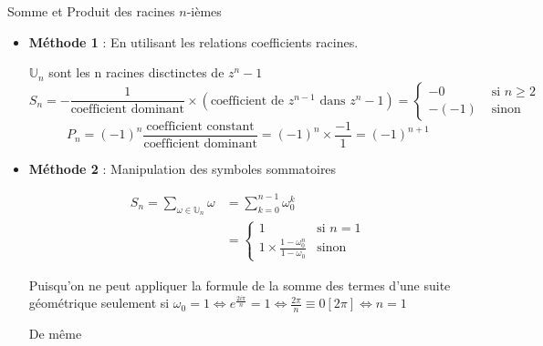 \documentclass{article}
\renewenvironment{question_kholle}[2][ ]
{
	\subsection{\texorpdfstring{#2}{}}
	\notblank{#1}
	{
		\noindent #1
		\bigbreak
	}
	{}
	\begin{proof}
}
{
	\end{proof}
}
\begin{document}
\begin{question_kholle}{Somme et Produit des racines $n$-ièmes}
  \;\\
  \begin{itemize}[label=$\lozenge$]
    \item \textbf{Méthode 1} : En utilisant les relations coefficients racines.

          $\mathbb{U}_{n}$ sont les n racines disctinctes de $z^{n}-1$
          $$S_{n} = - \frac{1}{\text{coefficient dominant}}\times(\text{coefficient de }z^{n-1} \text{ dans }z^{n}-1)= \left\{ \begin{array}{ll}
              -0    & \text{ si }  n\geqslant 2 \\
              -(-1) & \text{ sinon}
            \end{array}\right.$$
          $$
            P_{n} = (-1)^{n} \frac{\text{coefficient constant}}{\text{coefficient dominant}} = (-1) ^{n}\times \frac{-1}{1} = (-1)^{n+1}
          $$

    \item \textbf{Méthode 2} : Manipulation des symboles sommatoires

          \begin{align*}
            S_{n} = \sum_{\omega \in \mathbb{U}_{n}}\omega & = \sum_{k=0}^{n-1}\omega_{0}^{k}                                                                    \\
                                                           & = \left\{ \begin{array}{ll}
                                                                         1                                                & \text{si }  n =1 \\
                                                                         1 \times \frac{1 - \omega_{0}^{n}}{1-\omega_{0}} & \text{sinon}
                                                                       \end{array}\right.
          \end{align*}

          Puisqu'on ne peut appliquer la formule de la somme des termes d'une suite géométrique seulement si $\omega_{0} = 1 \iff e^{\frac{2i\pi}{n}} = 1 \iff \frac{2\pi}{n} \equiv 0 [2\pi] \iff n = 1$

          De même


\end{itemize}
\end{question_kholle}
\end{document}
